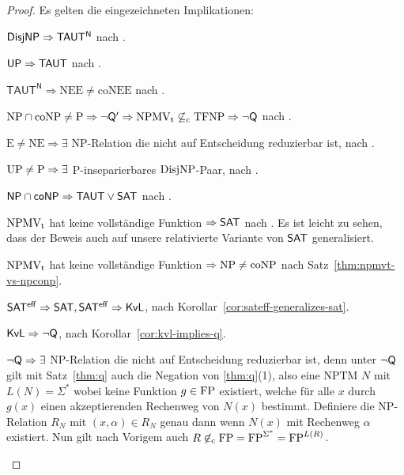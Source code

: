 \begin{proof}
    Es gelten die eingezeichneten Implikationen:
    \begin{Prooflist}[nosep,midpenalty=0, label={\arabic*.},labelsep=3pt]
\item $\mathsf{DisjNP} \Rightarrow \mathsf{TAUT^N}$ nach \textcite[Cor.~6.1]{kobler_optimal_2003}.
\item $\mathsf{UP} \Rightarrow \mathsf{TAUT}$ nach \textcite[Cor.~4.1]{kobler_optimal_2003}. %
\item $\mathsf{TAUT^N}\Rightarrow \mathrm{NEE\neq coNEE}$ nach \textcite[Cor.~7.1]{kobler_optimal_2003}.
\item $\mathrm{NP}\cap\mathrm{coNP}\neq \mathrm{P} \Rightarrow \neg\mathsf{Q}' \Rightarrow \mathrm{NPMV_t} \not\subseteq_\mathrm{c} \mathrm{TFNP} \Rightarrow \neg\mathsf{Q}$ nach \textcite[Prop.~9, Thm. 6]{fenner_inverting_2003}.
\item $\mathrm{E\neq NE}\Rightarrow \exists$ NP-Relation die nicht auf Entscheidung reduzierbar ist, nach \textcite{impagliazzo_1991}.
\item $\mathrm{UP}\neq\mathrm{P} \Rightarrow \exists$ P-inseparierbares $\mathrm{DisjNP}$-Paar, nach \textcite[Thm.~5]{grollmann_complexity_1988}.
\item $\mathsf{NP}{}\cap{}\mathsf{coNP}\Rightarrow \mathsf{TAUT}\lor\mathsf{SAT}$ nach \textcite[Cor.~5.1]{kobler_optimal_2003}. %
\item $\mathrm{NPMV_t}$ hat keine vollständige Funktion $\Rightarrow \mathsf{SAT}$ nach \textcite[Thm.~25]{beyersdorff_nondeterministic_2009}. Es ist leicht zu sehen, dass der Beweis auch auf unsere relativierte Variante von $\mathsf{SAT}$ generalisiert.
\item $\mathrm{NPMV_t}$ hat keine vollständige Funktion $\Rightarrow \mathrm{NP}\neq\mathrm{coNP}$ nach Satz~\ref{thm:npmvt-vs-npconp}.
\item $\mathsf{SAT^{eff}} \Rightarrow \mathsf{SAT}, \mathsf{SAT^{eff}}\Rightarrow \mathsf{KvL}$, nach Korollar~\ref{cor:sateff-generalizes-sat}.
\item $\mathsf{KvL}\Rightarrow\neg\mathsf{Q}$, nach Korollar~\ref{cor:kvl-implies-q}.
\item $\neg\mathsf{Q}\Rightarrow \exists$ NP-Relation die nicht auf Entscheidung reduzierbar ist, denn unter $\neg\mathsf{Q}$ gilt mit Satz~\ref{thm:q} auch die Negation von \ref{thm:q}(1), also eine NPTM $N$ mit $L(N)=\Sigma^*$ wobei keine Funktion $g\in\mathrm{FP}$ existiert, welche für alle $x$ durch $g(x)$ einen akzeptierenden Rechenweg von $N(x)$ bestimmt.
    Definiere die NP-Relation $R_N$ mit $(x,\alpha)\in R_N$ genau dann wenn $N(x)$ mit Rechenweg $\alpha$ existiert. Nun gilt nach Vorigem auch $R\not\in_\mathrm{c} \mathrm{FP}=\mathrm{FP}^{\Sigma^*} = \mathrm{FP}^{L(R)}$.

\end{Prooflist}
\end{proof}

